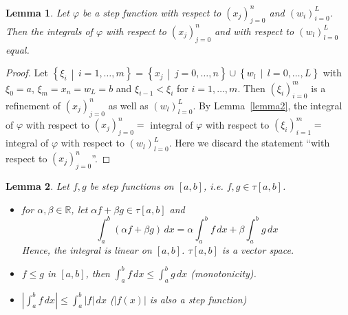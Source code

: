 \documentclass{article}
\newtheorem{lemma}{Lemma}  \numberwithin{lemma}{section}
\newcommand{\setdef}[2]{\left\{\left.#1\,\middle|\,#2\right.\right\}}
\newcommand{\card}[1]{\left|#1\right|}
\begin{document}
\begin{lemma} %
  \label{lemma3}
  Let $\varphi$ be a step function with respect to $(x_j)_{j=0}^n$ and $(w_i)_{i=0}^L$.
  Then the integrals of $\varphi$ with respect to $(x_j)_{j=0}^n$ and with respect to $(w_l)_{l=0}^L$ equal.
\end{lemma}

\begin{proof}
  Let $\setdef{\xi_i}{i = 1, \dots, m} = \setdef{x_j}{j = 0, \dots, n} \cup \setdef{w_l}{l = 0, \dots, L}$
  with $\xi_0 = a$, $\xi_m = x_n = w_L = b$ and $\xi_{i-1} < \xi_i$ for $i = 1, \dots, m$.
  Then $(\xi_i)_{i=0}^m$ is a refinement of $(x_j)_{j=0}^n$ as well as $(w_l)_{l=0}^L$.
  By Lemma~\ref{lemma2}, the integral of $\varphi$ with respect to $(x_j)_{j=0}^n =$ integral of $\varphi$
  with respect to $(\xi_i)_{i=1}^m =$ integral of $\varphi$ with respect to $(w_l)_{l=0}^L$.
  Here we discard the statement \enquote{with respect to $(x_j)_{j=0}^n$}.
\end{proof}

\begin{lemma} %
  \label{lem4}
  Let $f,g$ be step functions on $[a,b]$, i.e. $f,g \in \tau[a,b]$.
  \begin{itemize}
    \item
      for $\alpha, \beta \in \mathbb R$, let $\alpha f + \beta g \in \tau[a,b]$ and
      \[ \int_a^b (\alpha f + \beta g) \, dx = \alpha \int_a^bf \, dx + \beta \int_a^b g \, dx \]
      Hence, the integral is linear on $[a,b]$. $\tau[a,b]$ is a vector space.
    \item $f \leq g$ in $[a,b]$, then $\int_a^b f \, dx \leq \int_a^b g \, dx$ (monotonicity).
    \item $\card{\int_a^b f \, dx} \leq \int_a^b \card{f} \, dx$ ($\card{f(x)}$ is also a step function)
  \end{itemize}
\end{lemma}
\end{document}
